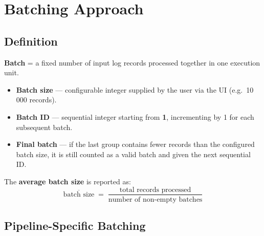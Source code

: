 \documentclass[11pt,a4paper]{article}
\begin{document}
\section{Batching Approach}

\subsection{Definition}

\begin{tcolorbox}[basebox, colback=LightBg, colframe=AccentCyan,
                  title={Batch Definition}]
\textbf{Batch} = a fixed number of input log records processed together in one execution unit.

\begin{itemize}
  \item \textbf{Batch size} --- configurable integer supplied by the user via the UI (e.g.\ 10\,000 records).
  \item \textbf{Batch ID} --- sequential integer starting from \textbf{1}, incrementing by 1 for each subsequent batch.
  \item \textbf{Final batch} --- if the last group contains fewer records than the configured batch size, it is still counted as a valid batch and given the next sequential ID.
\end{itemize}
\end{tcolorbox}

The \textbf{average batch size} is reported as:
\[
  \overline{\text{batch size}} \;=\;
  \frac{\text{total records processed}}{\text{number of non-empty batches}}
\]

\subsection{Pipeline-Specific Batching}
\end{document}
